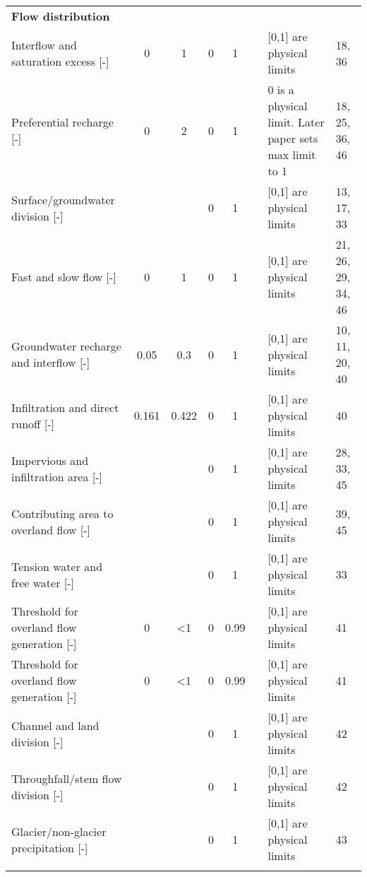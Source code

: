 \begin{longtable}{p{11.215em}ccccp{13em}p{13em}l}
\textbf{Flow distribution} &       &       &       &       & \multicolumn{1}{l}{} & \multicolumn{1}{l}{} &  \\
    Interflow and saturation excess [-] & 0     & 1     & 0     & 1     & \multicolumn{1}{l}{} & [0,1] are physical limits & \multicolumn{1}{p{10em}}{18, 36} \\
    Preferential recharge [-]& 0     & 2     & 0     & 1     & \cite{Chiew1994} & 0 is a physical limit. Later paper sets max limit to 1 & \multicolumn{1}{p{10em}}{18, 25, 36, 46} \\
    Surface/groundwater division  [-]&       &       & 0     & 1     & \multicolumn{1}{l}{} & [0,1] are physical limits & \multicolumn{1}{p{10em}}{13, 17, 33} \\
    Fast and slow flow [-]& 0     & 1     & 0     & 1     & \multicolumn{1}{l}{} & [0,1] are physical limits & \multicolumn{1}{p{10em}}{21, 26, 29, 34, 46} \\
    Groundwater recharge and interflow [-]& 0.05  & 0.3   & 0     & 1     & \cite{Son2007} & [0,1] are physical limits & \multicolumn{1}{p{10em}}{10, 11, 20, 40} \\
    Infiltration and direct runoff [-] & 0.161 & 0.422 & 0     & 1     & \cite{Tan1996} & [0,1] are physical limits & 40 \\
    Impervious and infiltration area [-]&       &       & 0     & 1     & \multicolumn{1}{l}{} & [0,1] are physical limits & \multicolumn{1}{p{10em}}{28, 33, 45} \\
    Contributing area to overland flow [-]&       &       & 0     & 1     & \multicolumn{1}{l}{} & [0,1] are physical limits & \multicolumn{1}{p{10em}}{39, 45} \\
    Tension water and free water [-]&       &       & 0     & 1     & \multicolumn{1}{l}{} & [0,1] are physical limits & 33 \\
    Threshold for overland flow generation [-] & 0     & \multicolumn{1}{p{3.785em}}{<1} & 0     & 0.99  & \cite{Nielsen1973} & [0,1] are physical limits & 41 \\
    Threshold for overland flow generation [-]& 0     & \multicolumn{1}{p{3.785em}}{<1} & 0     & 0.99  & \cite{Nielsen1973} & [0,1] are physical limits & 41 \\
    Channel and land division [-]&       &       & 0     & 1     & \multicolumn{1}{l}{} & [0,1] are physical limits & 42 \\
    Throughfall/stem flow division [-]&       &       & 0     & 1     & \multicolumn{1}{l}{} & [0,1] are physical limits & 42 \\
    Glacier/non-glacier precipitation [-]&       &       & 0     & 1     & \multicolumn{1}{l}{} & [0,1] are physical limits & 43 \\
    \multicolumn{1}{l}{} &       &       &       &       & \multicolumn{1}{l}{} & \multicolumn{1}{l}{} &  \\


\end{longtable}
